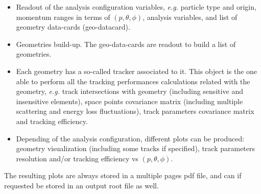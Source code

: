 \begin{itemize}

 \item  Readout of the analysis configuration variables, {\it e.g.} particle type and origin, momentum ranges in terms of $(p,\theta,\phi)$, 
 analysis variables, and list of geometry data-cards (geo-datacard).
 
 \item  Geometries build-up. The geo-data-cards are readout to build a list of geometries.
 
 \item  Each geometry has a so-called tracker associated to it. This object is the one able to perform all the tracking performances 
 calculations related with the geometry, {\it e.g.} track intersections with geometry (including sensitive and insensitive elements), space points 
 covariance matrix (including multiple scattering and energy loss fluctuations), track parameters covariance matrix and tracking efficiency.
 
 \item  Depending of the analysis configuration, different plots can be produced: geometry visualization (including some tracks if specified), 
 track parameters resolution  and/or tracking efficiency vs $(p,\theta,\phi)$.
 
\end{itemize}

The resulting plots are always stored in a multiple pages pdf file, and can if requested be stored in an output root file as well.